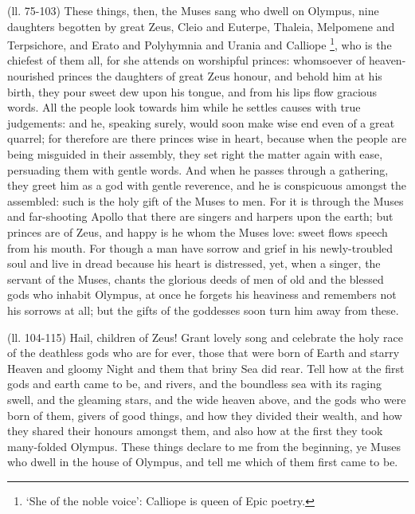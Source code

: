 (ll. 75-103) These things, then, the Muses sang who dwell on Olympus, nine
daughters begotten by great Zeus, Cleio and Euterpe, Thaleia, Melpomene and
Terpsichore, and Erato and Polyhymnia and Urania and Calliope \footnote{‘She of the noble
voice’: Calliope is queen of Epic poetry.}, who is the chiefest of them all,
for she attends on worshipful princes: whomsoever of heaven-nourished princes
the daughters of great Zeus honour, and behold him at his birth, they pour
sweet dew upon his tongue, and from his lips flow gracious words. All the
people look towards him while he settles causes with true judgements: and he,
speaking surely, would soon make wise end even of a great quarrel; for
therefore are there princes wise in heart, because when the people are being
misguided in their assembly, they set right the matter again with ease,
persuading them with gentle words. And when he passes through a gathering, they
greet him as a god with gentle reverence, and he is conspicuous amongst the
assembled: such is the holy gift of the Muses to men. For it is through the
Muses and far-shooting Apollo that there are singers and harpers upon the
earth; but princes are of Zeus, and happy is he whom the Muses love: sweet
flows speech from his mouth. For though a man have sorrow and grief in his
newly-troubled soul and live in dread because his heart is distressed, yet,
when a singer, the servant of the Muses, chants the glorious deeds of men of
old and the blessed gods who inhabit Olympus, at once he forgets his heaviness
and remembers not his sorrows at all; but the gifts of the goddesses soon turn
him away from these.

(ll. 104-115) Hail, children of Zeus! Grant lovely song and celebrate the holy
race of the deathless gods who are for ever, those that were born of Earth and
starry Heaven and gloomy Night and them that briny Sea did rear. Tell how at
the first gods and earth came to be, and rivers, and the boundless sea with its
raging swell, and the gleaming stars, and the wide heaven above, and the gods
who were born of them, givers of good things, and how they divided their
wealth, and how they shared their honours amongst them, and also how at the
first they took many-folded Olympus. These things declare to me from the
beginning, ye Muses who dwell in the house of Olympus, and tell me which of
them first came to be.


